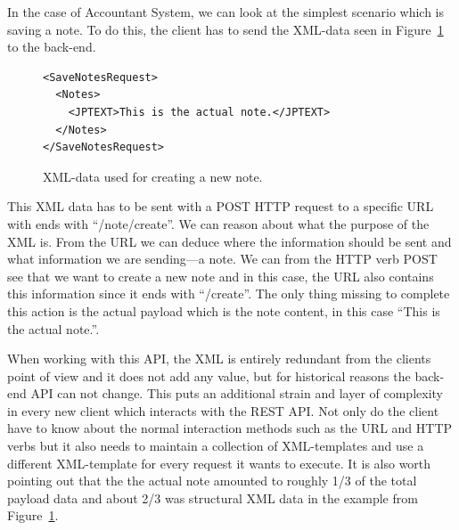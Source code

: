 \documentclass{cslthse-msc}
\begin{document}
In the case of Accountant System, we can look at the simplest scenario which is saving a note. To do this, the client has to send the XML-data seen in Figure~\ref{fig:xml_account_example} to the back-end.

\begin{figure}[H]
  \centering
    \begin{center}
\begin{lstlisting}[breaklines=true,frame=single]
<SaveNotesRequest>
  <Notes>
    <JPTEXT>This is the actual note.</JPTEXT>
  </Notes>
</SaveNotesRequest>
\end{lstlisting}
    \end{center}
  \caption{XML-data used for creating a new note.}
  \label{fig:xml_account_example}
\end{figure}


This XML data has to be sent with a POST HTTP request to a specific URL with ends with \enquote{/note/create}. We can reason about what the purpose of the XML is. From the URL we can deduce where the information should be sent and what information we are sending---a note. We can from the HTTP verb POST see that we want to create a new note and in this case, the URL also contains this information since it ends with \enquote{/create}. The only thing missing to complete this action is the actual payload which is the note content, in this case \enquote{This is the actual note.}.

When working with this API, the XML is entirely redundant from the clients point of view and it does not add any value, but for historical reasons the back-end API can not change. This puts an additional strain and layer of complexity in every new client which interacts with the REST API. Not only do the client have to know about the normal interaction methods such as the URL and HTTP verbs but it also needs to maintain a collection of XML-templates and use a different XML-template for every request it wants to execute. It is also worth pointing out that the the actual note amounted to roughly 1/3 of the total payload data and about 2/3 was structural XML data in the example from Figure~\ref{fig:xml_account_example}.
\end{document}
